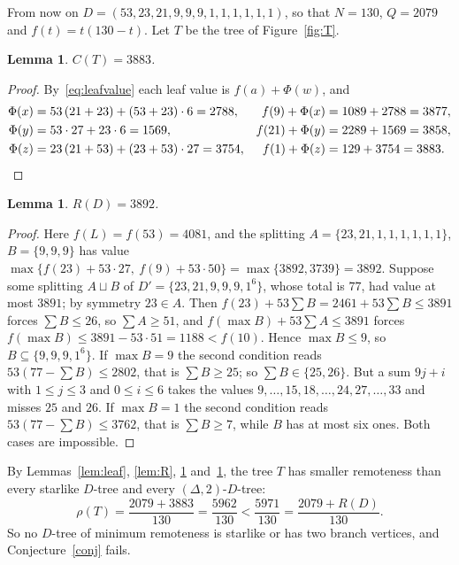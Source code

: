 \documentclass[11pt]{amsart}
\newtheorem{lemma}[thm]{Lemma}
\theoremstyle{definition}
\begin{document}
From now on $D=(53,23,21,9,9,9,1,1,1,1,1,1)$, so that $N=130$, $Q=2079$ and $f(t)=t(130-t)$. Let $T$ be the tree of
Figure~\ref{fig:T}.

\begin{lemma}\label{lem:T}
$C(T)=3883$.
\end{lemma}

\begin{proof}
By~\eqref{eq:leafvalue} each leaf value is $f(a)+\Phi(w)$, and
\begin{align*}
\Phi(x)&=53\,(21+23)+(53+23)\cdot6=2788, & f(9)+\Phi(x)&=1089+2788=3877,\\
\Phi(y)&=53\cdot27+23\cdot6=1569, & f(21)+\Phi(y)&=2289+1569=3858,\\
\Phi(z)&=23\,(21+53)+(23+53)\cdot27=3754, & f(1)+\Phi(z)&=129+3754=3883. \qedhere
\end{align*}
\end{proof}

\begin{lemma}\label{lem:RD}
$R(D)=3892$.
\end{lemma}

\begin{proof}
Here $f(L)=f(53)=4081$, and the splitting $A=\{23,21,1,1,1,1,1,1\}$, $B=\{9,9,9\}$ has value
$\max\{f(23)+53\cdot27,\ f(9)+53\cdot50\}=\max\{3892,3739\}=3892$. Suppose some splitting $A\sqcup B$ of
$D'=\{23,21,9,9,9,1^6\}$, whose total is $77$, had value at most $3891$; by symmetry $23\in A$. Then
$f(23)+53\sum B=2461+53\sum B\le3891$ forces $\sum B\le26$, so $\sum A\ge51$, and
$f(\max B)+53\sum A\le3891$ forces $f(\max B)\le3891-53\cdot51=1188<f(10)$. Hence $\max B\le9$, so
$B\subseteq\{9,9,9,1^6\}$. If $\max B=9$ the second condition reads $53(77-\sum B)\le2802$, that is $\sum B\ge25$; so
$\sum B\in\{25,26\}$. But a sum $9j+i$ with $1\le j\le3$ and $0\le i\le6$ takes the values
$9,\dots,15,18,\dots,24,27,\dots,33$ and misses $25$ and $26$. If $\max B=1$ the second condition reads
$53(77-\sum B)\le3762$, that is $\sum B\ge7$, while $B$ has at most six ones. Both cases are impossible.
\end{proof}

By Lemmas~\ref{lem:leaf}, \ref{lem:R}, \ref{lem:T} and~\ref{lem:RD}, the tree $T$ has smaller remoteness than every
starlike $D$-tree and every $(\Delta,2)$-$D$-tree:
\[
\rho(T)=\frac{2079+3883}{130}=\frac{5962}{130}<\frac{5971}{130}=\frac{2079+R(D)}{130}.
\]
So no $D$-tree of minimum remoteness is starlike or has two branch vertices, and Conjecture~\ref{conj} fails.
\end{document}
